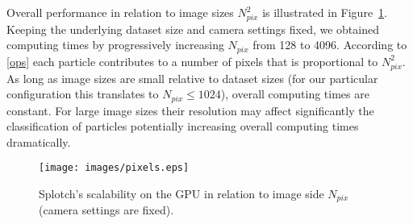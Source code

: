 \documentclass[1p]{elsarticle}
\begin{document}
Overall performance in relation to image sizes $N_{pix}^2$ is illustrated in Figure~\ref{fig:pixels}. Keeping the underlying dataset size and camera settings fixed, we obtained computing times by progressively increasing
$N_{pix}$ from 128 to 4096. According to \eqref{ops} each particle contributes to a number of pixels that is proportional to $N_{pix}^{2}$. As long as image sizes are small relative to dataset sizes (for our particular configuration this translates to $N_{pix} \le 1024$), overall computing times are constant. For large image sizes their resolution may affect significantly the classification of particles potentially increasing overall computing times dramatically.

\begin{figure}
\centering
\texttt{[image: images/pixels.eps]}
\caption{Splotch's scalability on the GPU in relation to image side $N_{pix}$ (camera settings are fixed).}
\label{fig:pixels}
\end{figure}
\end{document}
